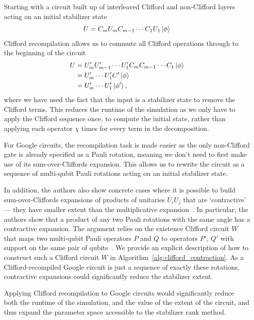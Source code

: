 Starting with a circuit built up of interleaved Clifford and non-Clifford layers acting on an initial stabilizer state
\[U = C_{m}U_{m}C_{m-1}\cdots C_{1}U_{1}\ket{\phi}\]
Clifford recompilation allows us to commute all Clifford operations through to the beginning of the circuit
\begin{align*}
U &= U_{m}'U_{m-1}'\cdots U_{1}' C_{m}C_{m-1}\cdots C_{1}\ket{\phi} \\
  &= U_{m}'\cdots U_{1}' C'\ket{\phi}\\
  &= U_{m}'\cdots U_{1}'\ket{\phi'},
\end{align*}
where we have used the fact that the input is a stabilizer state to remove the Clifford terms.
This reduces the runtime of the simulation as we only have to apply the Clifford sequence once, to compute the initial state, rather than applying each operator $\chi$ times for every term in the decomposition.\par
For Google circuits, the recompilation task is made easier as the only non-Clifford gate is already specified as a Pauli rotation, meaning we don't need to first make use of its sum-over-Cliffords expansion. This allows us to rewrite the circuit as a sequence of multi-qubit Pauli rotations acting on an initial stabilizer state.\par
In addition, the authors also show concrete cases where it is possible to build sum-over-Cliffords expansions of products of unitaries $U_{i}U_{j}$ that are `contractive' --- they have smaller extent than the multiplicative expansion~\cite{Qassim2019}. In particular, the authors show that a product of any two Pauli rotations with the same angle has a contractive expansion. The argument relies on the existence Clifford circuit $W$ that maps two multi-qubit Pauli operators $P$ and $Q$ to operators $P'$, $Q'$ with support on the same pair of qubits~\cite{Qassim2019}. We provide an explicit description of how to construct such a Clifford circuit $W$ in Algorithm~\ref{alg:clifford_contraction}. As a Clifford-recompiled Google circuit is just a sequence of exactly these rotations, contractive expansions could significantly reduce the stabilizer extent.\par
Applying Clifford recompilation to Google circuits would significantly reduce both the runtime of the simulation, and the value of the extent of the circuit, and thus expand the parameter space accessible to the stabilizer rank method.
